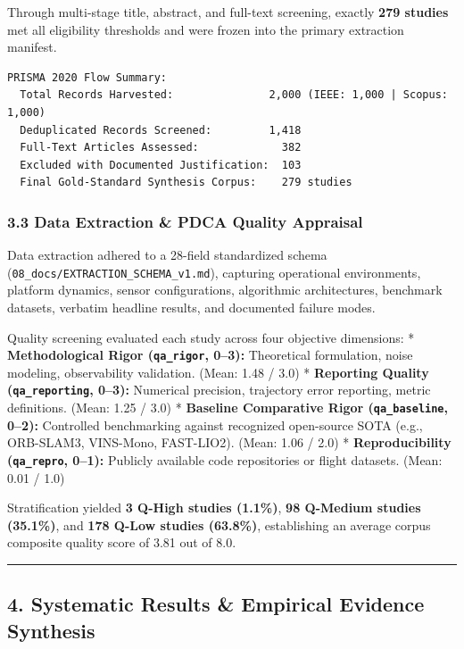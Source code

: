 \documentclass[journal]{IEEEtran}
\begin{document}
Through multi-stage title, abstract, and full-text screening, exactly
\textbf{279 studies} met all eligibility thresholds and were frozen into
the primary extraction manifest.

\begin{verbatim}
PRISMA 2020 Flow Summary:
  Total Records Harvested:               2,000 (IEEE: 1,000 | Scopus: 1,000)
  Deduplicated Records Screened:         1,418
  Full-Text Articles Assessed:             382
  Excluded with Documented Justification:  103
  Final Gold-Standard Synthesis Corpus:    279 studies
\end{verbatim}

\subsubsection{3.3 Data Extraction \& PDCA Quality
Appraisal}\label{data-extraction-pdca-quality-appraisal}

Data extraction adhered to a 28-field standardized schema
(\texttt{08\_docs/EXTRACTION\_SCHEMA\_v1.md}), capturing operational
environments, platform dynamics, sensor configurations, algorithmic
architectures, benchmark datasets, verbatim headline results, and
documented failure modes.

Quality screening evaluated each study across four objective dimensions:
* \textbf{Methodological Rigor (\texttt{qa\_rigor}, 0--3):} Theoretical
formulation, noise modeling, observability validation. (Mean: 1.48 /
3.0) * \textbf{Reporting Quality (\texttt{qa\_reporting}, 0--3):}
Numerical precision, trajectory error reporting, metric definitions.
(Mean: 1.25 / 3.0) * \textbf{Baseline Comparative Rigor
(\texttt{qa\_baseline}, 0--2):} Controlled benchmarking against
recognized open-source SOTA (e.g., ORB-SLAM3, VINS-Mono, FAST-LIO2).
(Mean: 1.06 / 2.0) * \textbf{Reproducibility (\texttt{qa\_repro},
0--1):} Publicly available code repositories or flight datasets. (Mean:
0.01 / 1.0)

Stratification yielded \textbf{3 Q-High studies (1.1\%)}, \textbf{98
Q-Medium studies (35.1\%)}, and \textbf{178 Q-Low studies (63.8\%)},
establishing an average corpus composite quality score of 3.81 out of
8.0.

\begin{center}\rule{0.5\linewidth}{0.5pt}\end{center}

\subsection{4. Systematic Results \& Empirical Evidence
Synthesis}\label{systematic-results-empirical-evidence-synthesis}
\end{document}
